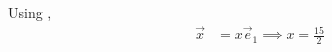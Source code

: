 	Using ,
\begin{align}
	\vec{x} &=x\vec{e}_1
	\implies x = \frac{15}{2}
\end{align}
\iffalse
		See \figref{fig:11/10/1/4}.
	\begin{figure}[H]
		\centering
 \texttt{[image: chapters/11/10/1/4/figs/line.png]}
		\caption{}
		\label{fig:11/10/1/4}
  	\end{figure}
	\fi
